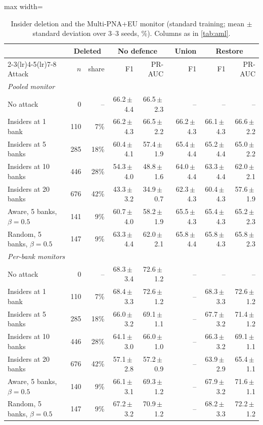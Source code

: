 \begin{table}[!htbp]\centering\small\setlength{\tabcolsep}{4pt}
\caption{Insider deletion and the Multi-PNA+EU monitor (standard training; mean $\pm$ standard deviation over 3--3 seeds, \%). Columns as in \cref{tab:aml}.}\label{tab:amlpna}
\begin{adjustbox}{max width=\linewidth}\begin{tabular}{lrrrrrrr}\toprule
 & \multicolumn{2}{c}{Deleted} & \multicolumn{2}{c}{No defence} & Union & \multicolumn{2}{c}{Restore} \\\cmidrule(lr){2-3}\cmidrule(lr){4-5}\cmidrule(lr){7-8}
Attack & $n$ & share & F1 & PR-AUC & F1 & F1 & PR-AUC \\\midrule
\multicolumn{8}{l}{\emph{Pooled monitor}} \\
No attack & 0 & -- & 66.2\,$\pm$\,4.4 & 66.5\,$\pm$\,2.3 & -- & -- & -- \\
Insiders at 1 bank & 110 & 7\% & 66.2\,$\pm$\,4.3 & 66.5\,$\pm$\,2.2 & 66.2\,$\pm$\,4.3 & 66.1\,$\pm$\,4.3 & 66.6\,$\pm$\,2.2 \\
Insiders at 5 banks & 285 & 18\% & 60.4\,$\pm$\,4.1 & 57.4\,$\pm$\,1.9 & 65.4\,$\pm$\,4.4 & 65.2\,$\pm$\,4.4 & 65.0\,$\pm$\,2.2 \\
Insiders at 10 banks & 446 & 28\% & 54.3\,$\pm$\,4.0 & 48.8\,$\pm$\,1.6 & 64.0\,$\pm$\,4.4 & 63.3\,$\pm$\,4.4 & 62.0\,$\pm$\,2.1 \\
Insiders at 20 banks & 676 & 42\% & 43.3\,$\pm$\,3.2 & 34.9\,$\pm$\,0.7 & 62.3\,$\pm$\,4.3 & 60.4\,$\pm$\,4.3 & 57.6\,$\pm$\,1.9 \\
Aware, 5 banks, $\beta=0.5$ & 141 & 9\% & 60.7\,$\pm$\,4.0 & 58.2\,$\pm$\,1.9 & 65.5\,$\pm$\,4.3 & 65.4\,$\pm$\,4.3 & 65.2\,$\pm$\,2.3 \\
Random, 5 banks, $\beta=0.5$ & 147 & 9\% & 63.3\,$\pm$\,4.4 & 62.0\,$\pm$\,2.1 & 65.8\,$\pm$\,4.4 & 65.8\,$\pm$\,4.3 & 65.8\,$\pm$\,2.3 \\
\multicolumn{8}{l}{\emph{Per-bank monitors}} \\
No attack & 0 & -- & 68.3\,$\pm$\,3.4 & 72.6\,$\pm$\,1.2 & -- & -- & -- \\
Insiders at 1 bank & 110 & 7\% & 68.4\,$\pm$\,3.3 & 72.6\,$\pm$\,1.2 & -- & 68.3\,$\pm$\,3.3 & 72.6\,$\pm$\,1.2 \\
Insiders at 5 banks & 285 & 18\% & 66.0\,$\pm$\,3.2 & 69.1\,$\pm$\,1.1 & -- & 67.7\,$\pm$\,3.2 & 71.4\,$\pm$\,1.2 \\
Insiders at 10 banks & 446 & 28\% & 64.1\,$\pm$\,3.0 & 66.0\,$\pm$\,1.0 & -- & 66.3\,$\pm$\,3.2 & 69.1\,$\pm$\,1.1 \\
Insiders at 20 banks & 676 & 42\% & 57.1\,$\pm$\,2.8 & 57.2\,$\pm$\,0.9 & -- & 63.9\,$\pm$\,2.9 & 65.4\,$\pm$\,1.1 \\
Aware, 5 banks, $\beta=0.5$ & 140 & 9\% & 66.1\,$\pm$\,3.1 & 69.3\,$\pm$\,1.2 & -- & 67.9\,$\pm$\,3.2 & 71.6\,$\pm$\,1.1 \\
Random, 5 banks, $\beta=0.5$ & 147 & 9\% & 67.2\,$\pm$\,3.2 & 70.9\,$\pm$\,1.2 & -- & 68.2\,$\pm$\,3.3 & 72.2\,$\pm$\,1.2 \\
\bottomrule\end{tabular}\end{adjustbox}\end{table}